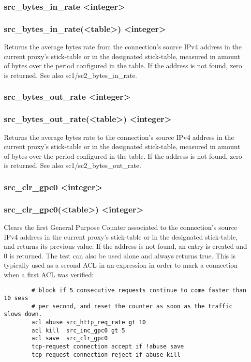 \subsubsection[src\_bytes\_in\_rate]{src\_bytes\_in\_rate <integer>}
\subsubsection*{src\_bytes\_in\_rate(<table>) <integer>}
  Returns the average bytes rate from the connection's source IPv4 address in
  the current proxy's stick-table or in the designated stick-table, measured in
  amount of bytes over the period configured in the table. If the address is
  not found, zero is returned. See also sc1/sc2\_bytes\_in\_rate.

\subsubsection[src\_bytes\_out\_rate]{src\_bytes\_out\_rate <integer>}
\subsubsection*{src\_bytes\_out\_rate(<table>) <integer>}
  Returns the average bytes rate to the connection's source IPv4 address in the
  current proxy's stick-table or in the designated stick-table, measured in
  amount of bytes over the period configured in the table. If the address is
  not found, zero is returned. See also sc1/sc2\_bytes\_out\_rate.

\subsubsection[src\_clr\_gpc0]{src\_clr\_gpc0 <integer>}
\subsubsection*{src\_clr\_gpc0(<table>) <integer>}
  Clears the first General Purpose Counter associated to the connection's
  source IPv4 address in the current proxy's stick-table or in the designated
  stick-table, and returns its previous value. If the address is not found, an
  entry is created and 0 is returned. The test can also be used alone and
  always returns true. This is typically used as a second ACL in an expression
  in order to mark a connection when a first ACL was verified:

\begin{verbatim}
        # block if 5 consecutive requests continue to come faster than 10 sess
        # per second, and reset the counter as soon as the traffic slows down.
        acl abuse src_http_req_rate gt 10
        acl kill  src_inc_gpc0 gt 5
        acl save  src_clr_gpc0
        tcp-request connection accept if !abuse save
        tcp-request connection reject if abuse kill
\end{verbatim}


